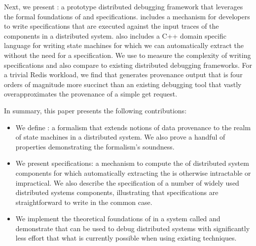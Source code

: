 Next, we present \fluent{}: a prototype distributed debugging framework that
leverages the formal foundations of \watprovenance{} and \watprovenance{}
specifications. \fluent{} includes a mechanism for developers to write
\watprovenance{} specifications that are executed against the input traces of
the components in a distributed system. \fluent{} also includes a C++ domain
specific language for writing state machines for which we can automatically
extract the \watprovenance{} without the need for a \watprovenance{}
specification. We use \fluent{} to measure the complexity of writing
\watprovenance{} specifications and also compare \fluent{} to existing
distributed debugging frameworks. For a trivial Redis workload, we find that
\fluent{} generates provenance output that is four orders of magnitude more
succinct than an existing
debugging tool that vastly overapproximates the
provenance of a simple get request.

In summary, this paper presents the following contributions:
\begin{itemize}
  \item
    We define \watprovenance{}: a formalism that extends notions of data
    provenance to the realm of state machines in a distributed system. We also
    prove a handful of properties demonstrating the formalism's soundness.
  \item
    We present \watprovenance{} specifications: a mechanism to compute the
    \watprovenance{} of distributed system components for which automatically
    extracting the \watprovenance{} is otherwise intractable or impractical. We
    also describe the \watprovenance{} specification of a number of widely used
    distributed systems components, illustrating that \watprovenance{}
    specifications are straightforward to write in the common case.
  \item
    We implement the theoretical foundations of \watprovenance{} in a system
    called \fluent{} and demonstrate that \fluent{} can be used to debug
    distributed systems with significantly less effort that what is currently
    possible when using existing techniques.
\end{itemize}
